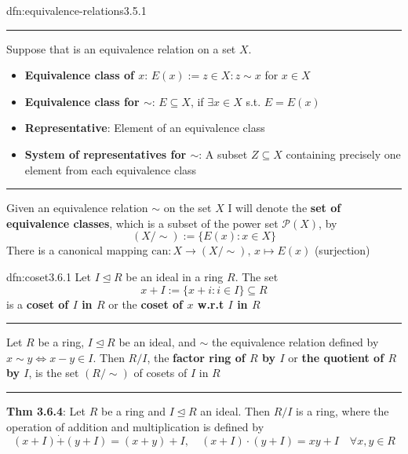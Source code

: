 \documentclass[landscape, 8pt]{extarticle}
\begin{document}
\begin{multicols}{3}
\begin{dfn}{dfn:equivalence-relations}{3.5.1}
    \vspace{-5pt}
    \noindent\rule{\textwidth}{0.2pt}

    Suppose that  is an equivalence relation on a set $X$.

    \vspace{-5pt}
    \begin{itemize}[leftmargin=*]
        \setlength\itemsep{0em}
        \item \textbf{Equivalence class of $x$}: $E(x) := z\in X : z \sim x$ for $x\in X$
        \item \textbf{Equivalence class for $\sim$}: $E\subseteq X$, if $\exists x\in X$ s.t. $E = E(x)$
        \item \textbf{Representative}: Element of an equivalence class
        \item \textbf{System of representatives for $\sim$}: A subset $Z \subseteq X$ containing precisely one element from each equivalence class
    \end{itemize}

    \vspace{-5pt}
    \noindent\rule{\textwidth}{0.2pt}

    Given an equivalence relation $\sim$ on the set $X$ I will denote the \textbf{set of equivalence classes}, which is a subset of the power set $\mathcal{P}(X)$, by
    \[(X / \sim) := \{E(x) : x\in X\}\]
    There is a canonical mapping $\text{can}: X \to (X / \sim),\, x\mapsto E(x)$ (surjection)
\end{dfn}

\begin{dfn}[Coset]{dfn:coset}{3.6.1}
    Let $I \unlhd R$ be an ideal in a ring $R$. The set
    \[ x + I := \{x + i : i\in I\} \subseteq R\]
    is a \textbf{coset of $I$ in $R$} or the \textbf{coset of $x$ w.r.t $I$ in $R$}

    \noindent\rule{\textwidth}{0.2pt}
    Let $R$ be a ring, $I \unlhd R$ be an ideal, and $\sim$ the equivalence relation defined by $x \sim y \iff x - y \in I$. Then $R / I$, the \textbf{factor ring of $R$ by $I$} or \textbf{the quotient of $R$ by $I$}, is the set $(R / \sim)$ of cosets of $I$ in $R$

    \noindent\rule{\textwidth}{0.2pt}
    \textbf{Thm 3.6.4}: Let $R$ be a ring and $I \unlhd R$ an ideal. Then $R / I$ is a ring, where the operation of addition and multiplication is defined by
    \[(x + I) \dot{+} (y + I) = (x + y) + I, \quad (x + I) \cdot (y + I) = xy + I \quad \forall x,y\in R\]
\end{dfn}


\end{multicols}
\end{document}
